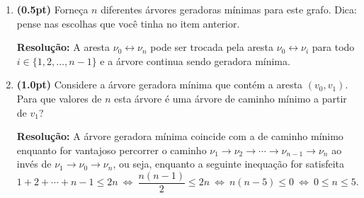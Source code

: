 \documentclass{article}
\begin{document}
\begin{enumerate}[resume*=exerc]
\begin{enumerate}[label=(\alph*),series=q4]
\item {\bf (0.5pt)} Forneça $n$ diferentes árvores geradoras mínimas para este grafo. Dica: pense nas escolhas que você tinha no item anterior.
\begin{framed}
{\bf Resolução:}
A aresta $\nu_0\leftrightarrow \nu_n$ pode ser trocada pela aresta $\nu_0\leftrightarrow \nu_i$ para todo $i\in\{1,2,\dots,n-1\}$ e a árvore continua sendo geradora mínima.
\vspace{5cm}
\end{framed}
\pagebreak
\item {\bf (1.0pt)} Considere a árvore geradora mínima que contém a aresta $(v_0,v_1)$. Para que valores de $n$ esta árvore é uma árvore de caminho mínimo a partir de $v_1$?
\begin{framed}
{\bf Resolução:}
A árvore geradora mínima coincide com a de caminho mínimo enquanto for vantajoso percorrer o caminho $\nu_1 \rightarrow \nu_2 \rightarrow \cdots \rightarrow \nu_{n-1} \rightarrow \nu_n$ ao invés de $\nu_1 \rightarrow \nu_0 \rightarrow \nu_n$, ou seja, enquanto a seguinte inequação for satisfeita
\[
1+2+\cdots+n-1 \le 2n ~\Leftrightarrow~ \frac{n(n-1)}{2} \le 2n ~\Leftrightarrow~
    n(n-5) \le 0 ~\Leftrightarrow~ \boxed{0 \le n \le 5}.
\]
\vspace{1cm}
\end{framed}
\end{enumerate}


\end{enumerate}
\end{document}
